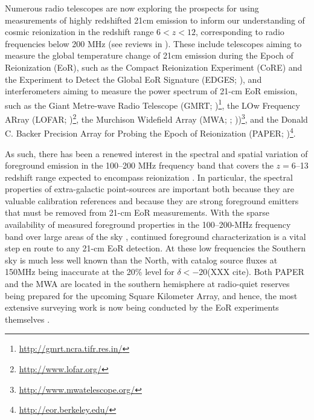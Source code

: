 \documentclass[preprint]{aastex}
\begin{document}
Numerous radio telescopes are now exploring the prospects for using
measurements of highly redshifted 21cm emission to inform our understanding of
cosmic reionization in the redshift range $6< z<12$, corresponding to radio
frequencies below 200 MHz (see reviews in
\citealt{Furlanetto:2006p2267,Morales:2010p8093,Pritchard:2012p9555}).  These
include telescopes aiming to measure the global temperature change of 21cm
emission during the Epoch of Reionization (EoR), such as the Compact
Reionization Experiment (CoRE) and the Experiment to Detect the Global EoR
Signature (EDGES; \citealt{Bowman:2010p8546}), and interferometers aiming to
measure the power spectrum of 21-cm EoR emission, such as the Giant Metre-wave
Radio Telescope (GMRT;
\citealt{Paciga:2011p9470,Paciga:2013p9627})\footnote{\url{http://gmrt.ncra.tifr.res.in/}},
the LOw Frequency ARray (LOFAR;
\citealt{Yatawatta:2013p9699})\footnote{\url{http://www.lofar.org/}}, the
Murchison Widefield Array (MWA;  \citealt{Bowman:2012p9138};
\citealt{Tingay:2013p9022}))\footnote{\url{http://www.mwatelescope.org/}}, and
the Donald C. Backer Precision Array for Probing the Epoch of Reionization
(PAPER; \citealt{Parsons:2010p6757,Parsons2013b})\footnote{\url{http://eor.berkeley.edu/}}.

As such, there has been a renewed interest in the spectral and spatial variation of
foreground emission in the 100--200 MHz frequency band that covers
the $z=6$--13 redshift range expected to encompass reionization
\citep{furlanetto_et_al2006}.
In particular, the spectral properties of extra-galactic point-sources are important
both because they are valuable calibration references
and because they are strong foreground emitters that must be removed from 21-cm EoR measurements.
With the sparse availability of measured foreground properties in the
100--200-MHz frequency band over large areas of the sky \citep{deolivieracosta_et_al2008}, continued
foreground characterization is a
vital step en route to any 21-cm EoR detection.
At these low
frequencies the Southern sky is much less well known than the North, 
with catalog source fluxes at 150MHz being inaccurate at the 20\% level
for $\delta<-20$\arcdeg (XXX cite).
Both PAPER and the MWA are located in the southern hemisphere at radio-quiet
reserves being prepared for the upcoming Square Kilometer Array, and hence,
the
most extensive surveying work is now being conducted by the EoR experiments
themselves \citep{Jacobs:2011p8438,Williams:2012p8768}.
\end{document}
